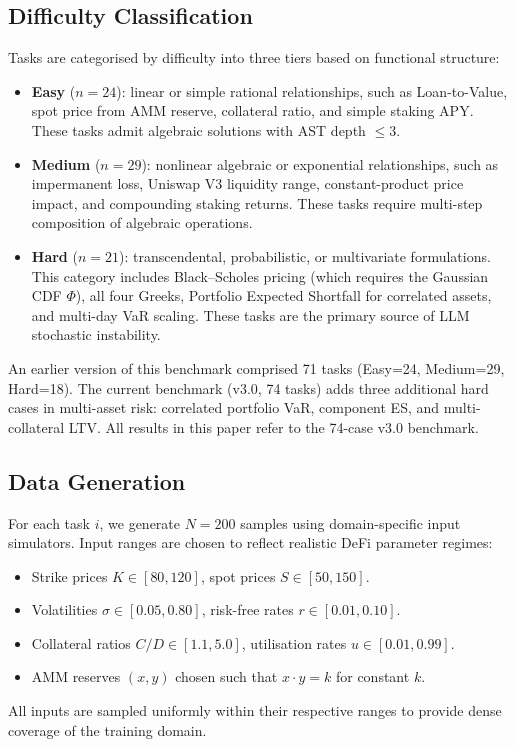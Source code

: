 \documentclass[twoside,11pt]{article}
\begin{document}
\subsection{Difficulty Classification}\label{subsec:difficulty-classification}
\label{sec:bench_difficulty}

Tasks are categorised by difficulty into three tiers based on functional structure:

\begin{itemize}
  \item \textbf{Easy} ($n=24$): linear or simple rational relationships, such as
    Loan-to-Value, spot price from AMM reserve, collateral ratio, and simple staking APY.
    These tasks admit algebraic solutions with AST depth $\le 3$.

  \item \textbf{Medium} ($n=29$): nonlinear algebraic or exponential relationships,
    such as impermanent loss, Uniswap V3 liquidity range, constant-product price impact,
    and compounding staking returns.  These tasks require multi-step composition
    of algebraic operations.

  \item \textbf{Hard} ($n=21$): transcendental, probabilistic, or multivariate
    formulations.  This category includes Black--Scholes pricing (which requires
    the Gaussian CDF $\Phi$), all four Greeks, Portfolio Expected Shortfall for
    correlated assets, and multi-day VaR scaling.  These tasks are the primary
    source of LLM stochastic instability.
\end{itemize}

\begin{remark}
An earlier version of this benchmark comprised 71 tasks (Easy=24, Medium=29,
Hard=18).  The current benchmark (v3.0, 74 tasks) adds three additional hard
cases in multi-asset risk: correlated portfolio VaR, component ES, and
multi-collateral LTV.  All results in this paper refer to the 74-case v3.0 benchmark.
\end{remark}

\subsection{Data Generation}\label{subsec:data-generation}
\label{sec:bench_datagen}

For each task $i$, we generate $N=200$ samples using domain-specific input
simulators.  Input ranges are chosen to reflect realistic DeFi parameter regimes:
\begin{itemize}
  \item Strike prices $K \in [80, 120]$, spot prices $S \in [50, 150]$.
  \item Volatilities $\sigma \in [0.05, 0.80]$, risk-free rates $r \in [0.01, 0.10]$.
  \item Collateral ratios $C/D \in [1.1, 5.0]$, utilisation rates $u \in [0.01, 0.99]$.
  \item AMM reserves $(x, y)$ chosen such that $x \cdot y = k$ for constant $k$.
\end{itemize}
All inputs are sampled uniformly within their respective ranges to provide dense
coverage of the training domain.
\end{document}
